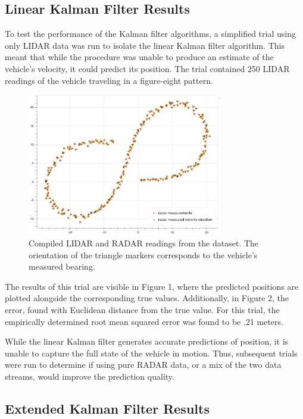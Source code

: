 \documentclass{article}
\begin{document}
\subsection{Linear Kalman Filter Results}
\label{ssec:lkfresults}

To test the performance of the Kalman filter algorithms, a simplified trial using only LIDAR data was run to isolate the linear Kalman filter algorithm. This meant that while the procedure was unable to produce an estimate of the vehicle's velocity, it could predict its position. The trial contained 250 LIDAR readings of the vehicle traveling in a figure-eight pattern.

\begin{figure}[hb]
\begin{minipage}[b]{1.0\linewidth}
  \centering
  \centerline{\includegraphics[width=8.5cm]{3.png}}
\end{minipage}
\caption{Compiled LIDAR and RADAR readings from the dataset. The orientation of the triangle markers corresponds to the vehicle's measured bearing.}
\end{figure}

The results of this trial are visible in Figure 1, where the predicted positions are plotted alongside the corresponding true values. Additionally, in Figure 2, the error, found with Euclidean distance from the true value. For this trial, the empirically determined root mean squared error was found to be .21 meters.

While the linear Kalman filter generates accurate predictions of position, it is unable to capture the full state of the vehicle in motion. Thus, subsequent trials were run to determine if using pure RADAR data, or a mix of the two data streams, would improve the prediction quality.

\subsection{Extended Kalman Filter Results}
\label{ssec:ekfresults}
\end{document}

